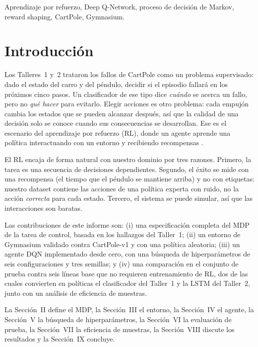 \documentclass[conference]{IEEEtran}
\begin{document}
\begin{IEEEkeywords}
Aprendizaje por refuerzo, Deep Q-Network, proceso de decisión de Markov, reward shaping, CartPole, Gymnasium.
\end{IEEEkeywords}

\section{Introducción}
Los Talleres~1 y~2 trataron los fallos de CartPole como un problema supervisado: dado el
estado del carro y del péndulo, decidir si el episodio fallará en los próximos cinco pasos.
Un clasificador de ese tipo dice \emph{cuándo} se acerca un fallo, pero no \emph{qué hacer}
para evitarlo. Elegir acciones es otro problema: cada empujón cambia los estados que se
pueden alcanzar después, así que la calidad de una decisión solo se conoce cuando sus
consecuencias se desarrollan. Ese es el escenario del aprendizaje por refuerzo (RL), donde
un agente aprende una política interactuando con un entorno y recibiendo recompensas
\cite{sutton2018}.

El RL encaja de forma natural con nuestro dominio por tres razones. Primero, la tarea es una
secuencia de decisiones dependientes. Segundo, el éxito se mide con una recompensa (el
tiempo que el péndulo se mantiene arriba) y no con etiquetas: nuestro dataset contiene las
acciones de una política experta con ruido, no la acción \emph{correcta} para cada estado.
Tercero, el sistema se puede simular, así que las interacciones son baratas.

Las contribuciones de este informe son: (i) una especificación completa del MDP de la
tarea de control, basada en los hallazgos del Taller~1; (ii) un entorno de Gymnasium
validado contra CartPole-v1 y con una política aleatoria; (iii) un agente DQN
\cite{mnih2015} implementado desde cero, con una búsqueda de hiperparámetros de seis
configuraciones y tres semillas; y (iv) una comparación en el conjunto de prueba contra
seis líneas base que no requieren entrenamiento de RL, dos de las cuales convierten en
políticas el clasificador del Taller~1 y la LSTM del Taller~2, junto con un análisis de
eficiencia de muestras.

La Sección~II define el MDP, la Sección~III el entorno, la Sección~IV el agente, la
Sección~V la búsqueda de hiperparámetros, la Sección~VI la evaluación de prueba, la
Sección~VII la eficiencia de muestras, la Sección~VIII discute los resultados y la
Sección~IX concluye.
\end{document}
